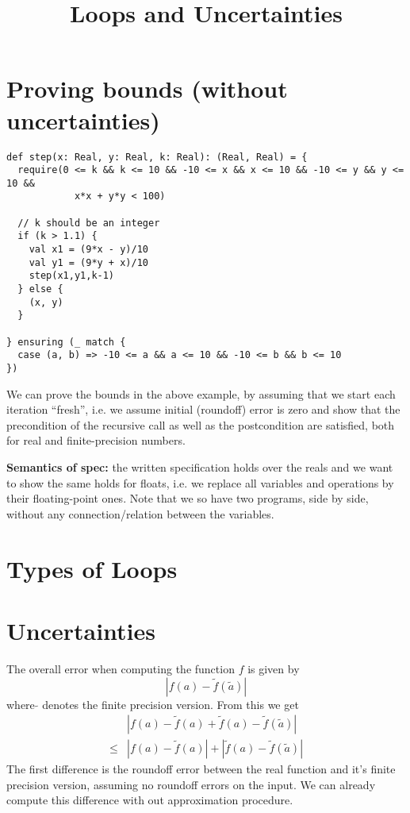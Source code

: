 \documentclass[10pt]{article}
\title{Loops and Uncertainties}
\author{}
\begin{document}
\maketitle


\section{Proving bounds (without uncertainties)}
\begin{lstlisting}
def step(x: Real, y: Real, k: Real): (Real, Real) = {
  require(0 <= k && k <= 10 && -10 <= x && x <= 10 && -10 <= y && y <= 10 &&
            x*x + y*y < 100)

  // k should be an integer
  if (k > 1.1) {
    val x1 = (9*x - y)/10
    val y1 = (9*y + x)/10
    step(x1,y1,k-1)
  } else {
    (x, y)
  }

} ensuring (_ match {
  case (a, b) => -10 <= a && a <= 10 && -10 <= b && b <= 10
})
\end{lstlisting}

We can prove the bounds in the above example, by assuming that we start each iteration
``fresh'', i.e. we assume initial (roundoff) error is zero and show that the precondition
of the recursive call as well as the postcondition are satisfied, both for real and finite-precision
numbers.

{\bf Semantics of spec:} the written specification holds over the reals and we want to show the
same holds for floats, i.e. we replace all variables and operations by their floating-point ones.
Note that we so have two programs, side by side, without any connection/relation between the variables.

\section{Types of Loops}

\section{Uncertainties}
The overall error when computing the function $f$ is given by
$$
|f(a) - \tilde{f}(\tilde{a})|
$$
where $\tilde{}$ denotes the finite precision version.
From this we get
\begin{align}
&|f(a) - \tilde{f}(a) + \tilde{f}(a) - \tilde{f}(\tilde{a})|\\
\le& |f(a) - \tilde{f}(a)| + |\tilde{f}(a) - \tilde{f}(\tilde{a})|
\end{align}
The first difference is the roundoff error between the real function and
it's finite precision version, assuming no roundoff errors on the input.
We can already compute this difference with out approximation procedure.
\end{document}
